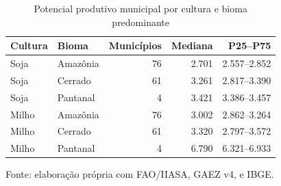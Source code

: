 \begin{table}[H]
\centering\normalsize
\setlength{\tabcolsep}{6pt}
\caption{Potencial produtivo municipal por cultura e bioma predominante}
\label{tab:h1-capacidade}
\begin{tabular}{llrrr}
\hline
Cultura & Bioma & Municípios & Mediana & P25--P75 \\
\hline
Soja & Amazônia & 76 & 2.701 & 2.557--2.852 \\
Soja & Cerrado & 61 & 3.261 & 2.817--3.390 \\
Soja & Pantanal & 4 & 3.421 & 3.386--3.457 \\
Milho & Amazônia & 76 & 3.002 & 2.862--3.264 \\
Milho & Cerrado & 61 & 3.320 & 2.797--3.572 \\
Milho & Pantanal & 4 & 6.790 & 6.321--6.933 \\
\hline
\end{tabular}
\par\smallskip\begin{minipage}{\textwidth}\normalsize\centering
Fonte: elaboração própria com FAO/IIASA, GAEZ v4, e IBGE.
\end{minipage}
\end{table}
